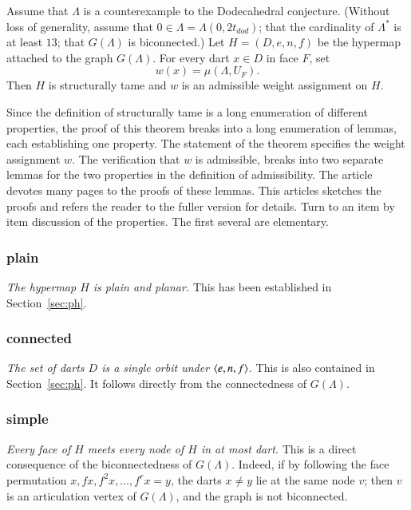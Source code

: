 \begin{theorem}  Assume that $\Lambda$ is a counterexample to the Dodecahedral
conjecture.  (Without loss of generality,  assume that $0\in\Lambda=\Lambda(0,2t_{dod})$;
that the cardinality of $\Lambda^*$ is at least $13$; that $G(\Lambda)$ is biconnected.)  Let $H=(D,e,n,f)$ be the hypermap attached to the graph $G(\Lambda)$.
 For every dart $x\in D$ in face $F$, set
$$w(x) = \mu(\Lambda,U_F).$$
Then $H$ is structurally tame and $w$ is an admissible weight assignment on $H$.
\end{theorem}



Since the definition of structurally tame is a long enumeration of different properties,
the proof of this theorem breaks into a long enumeration of lemmas, each establishing
one property.  The statement of the theorem specifies the weight assignment $w$.  The
verification that $w$ is admissible, breaks into two separate lemmas for the
two properties in the definition of admissibility.  The article \cite{arx} devotes
many pages to the proofs of these lemmas.  This articles sketches the proofs and
refers the reader to the fuller version for details.
Turn to an item by item discussion of the properties.  The first several
are elementary.

\subsubsection{plain}
{\it The hypermap $H$ is plain and planar.}  This has been established in Section~\ref{sec:ph}.


\subsubsection{connected}
{\it The set of darts $D$  is a single orbit under $\langle e,n,f\rangle$.}  This is also
contained in Section~\ref{sec:ph}. It follows directly from the
connectedness of $G(\Lambda)$.

\subsubsection{simple}

{\it Every face of $H$ meets every node of $H$ in at most
dart.}  This is a direct consequence of the biconnectedness of $G(\Lambda)$.
Indeed, if by following the face permutation $x,f x, f^2 x,\ldots, f^r x= y$,
the darts $x\ne y$ lie at the same node $v$; then $v$ is an articulation vertex
of $G(\Lambda)$, and the graph is not biconnected.

